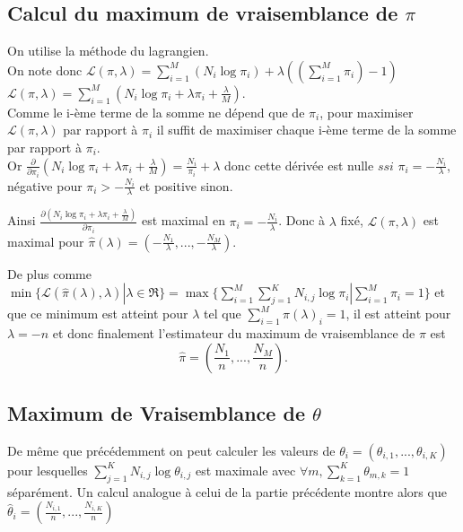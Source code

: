 \documentclass{article}
\begin{document}
\subsection{Calcul du maximum de vraisemblance de $\pi$}
On utilise la méthode du lagrangien.\\

On note donc $\mathcal{L}(\pi, \lambda) = \sum_{i=1}^{M} (N_{i} \log \pi_{i}) + \lambda((\sum_{i=1}^{M}\pi_{i})-1)$\\

 $\mathcal{L}(\pi, \lambda)=\sum_{i=1}^{M} (N_{i} \log\pi_{i}+\lambda\pi_{i}+\frac{\lambda}{M})$.\\
 Comme le i-ème terme de la somme ne dépend que de $\pi_{i}$, pour maximiser
 $\mathcal{L}(\pi, \lambda)$ par rapport à $\pi_i$ il suffit de maximiser chaque i-ème terme de la somme par rapport à $\pi_i$. \\
Or $\frac{\partial}{\partial \pi_i}( N_{i} \log\pi_{i}+\lambda\pi_{i}+\frac{\lambda}{M}) = \frac{N_{i}}{\pi_i} + \lambda$ donc cette dérivée est nulle $ssi$ $\pi_i=-\frac{N_i}{\lambda}$, négative pour $\pi_i>-\frac{N_i}{\lambda}$ et positive sinon. 

Ainsi $\frac{\partial (N_{i}
\log\pi_{i}+\lambda\pi_{i}+\frac{\lambda}{M})}{\partial \pi_i}$ est maximal en $\pi_i=-\frac{N_i}{\lambda}$. Donc à $\lambda$ fixé, $\mathcal{L}(\pi, \lambda)$ est maximal pour $\hat{\pi}(\lambda)=(-\frac{N_1}{\lambda}, ..., -\frac{N_M}{\lambda})$.

De plus comme $\min\{\mathcal{L}(\hat{\pi}(\lambda),
\lambda)|\lambda\in\Re\} = \max \{\sum_{i=1}^{M} \sum_{j=1}^K N_{i,j} \log\pi_i| \sum_{i=1}^{M}\pi_{i}=1 \}$ et que ce minimum est atteint pour $\lambda $ tel que $\sum_{i=1}^{M}\hat{\pi}(\lambda)_i=1$, il est atteint pour $\lambda = -n$ et donc finalement l'estimateur du maximum de vraisemblance de $\pi$ est $$\hat{\pi}=(\frac{N_1}{n}, ..., \frac{N_M}{n}).$$


\subsection{Maximum de Vraisemblance de $\theta$}
De même que précédemment on peut calculer les valeurs de $\theta_{i}=(\theta_{i,1}, ..., \theta_{i,K})$ pour lesquelles $\sum_{j=1}^K N_{i,j}\log\theta_{i,j}$ est maximale avec $\forall m,\sum_{k=1}^{K}\theta_{m,k}=1$ séparément.
Un calcul analogue à celui de la partie précédente montre alors que $\hat{\theta}_{i}=(\frac{N_{i,1}}{n}, ..., \frac{N_{i,K}}{n})$
\end{document}
